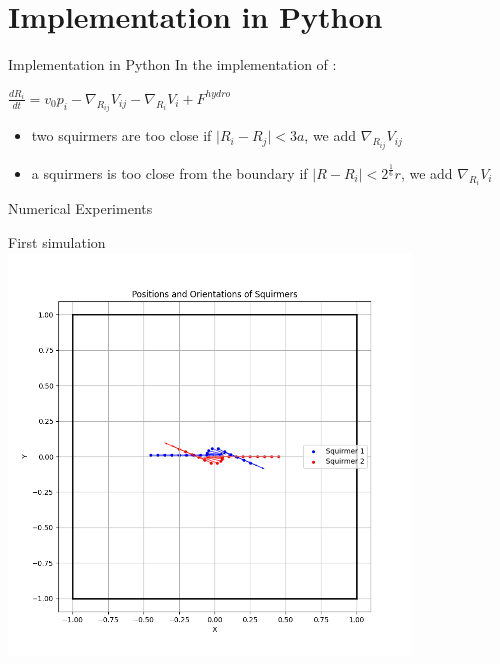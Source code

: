 \documentclass{beamer}
\begin{document}
\section{Implementation in Python}
\begin{frame}{Implementation in Python}
In the implementation of : \begin{center}
        \(\boxed{\frac{dR_i}{dt} = v_0 p_i -  \nabla_{R_{ij}} V_{ij} - \nabla_{R_i} V_i + F^{hydro}}\)
\end{center}
\begin{itemize}
    \item two squirmers are too close if $\lvert R_i-R_j\rvert < 3a$, we add $\nabla_{R_{ij}}V_{ij}$
    \item a squirmers is too close from the boundary if $\lvert R-R_i\rvert < 2^{\frac{1}{6}}r$, we add $\nabla_{R_{i}}V_{i}$
\end{itemize}

\begin{frame}{Numerical Experiments}
    \begin{center}
        First simulation
        \includegraphics[width=0.8\textwidth]{../../graphs/squirmers_colliding.png}
    \end{center}
\end{frame}


\end{frame}
\end{document}
